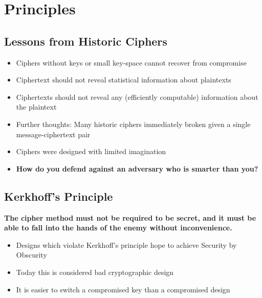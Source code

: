 

\chapter{Principles}

	\section{Lessons from Historic Ciphers}
		\begin{itemize}
			\item Ciphers without keys or small key-space cannot recover from compromise
			\item Ciphertext should not reveal statistical information about plaintexts
			\item Ciphertexts should not reveal any (efficiently computable) information about the plaintext
			\item Further thoughts: Many historic ciphers immediately broken given a single message-ciphertext pair
			\item Ciphers were designed with limited imagination
			\item \textbf{How do you defend against an adversary who is smarter than you?}
		\end{itemize}
	
	\section{Kerkhoff's Principle}
		\begin{center}
			\textbf{The cipher method must not be required to be secret, and it must be able to fall into the hands of the enemy without inconvenience.}
		\end{center}
		\begin{itemize}
			\item Designs which violate Kerkhoff's principle hope to achieve Security by Obscurity
			\item Today this is considered bad cryptographic design
			\item It is easier to switch a compromised key than a compromised design
		\end{itemize}
	
